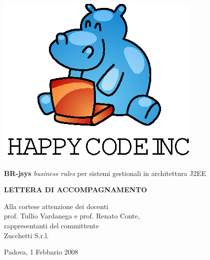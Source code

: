 \documentclass[11pt,titlepage,a4paper]{report}
\begin{document}
\begin{titlepage}
\begin{center}
\vspace*{0.5in}
\includegraphics{logo.eps}
\vspace*{0.2in}

{\Large \textbf{BR-jsys}}
{\Large \emph{business rules} per sistemi gestionali in architettura J2EE } 
\vspace{2in}

\LARGE \textbf {LETTERA DI ACCOMPAGNAMENTO}

\end{center}
\end{titlepage}
\vspace*{0.5in}


\thispagestyle{plain}
\begin{flushright}
Alla cortese attenzione dei docenti\\
prof. Tullio Vardanega e prof. Renato Conte,\\
rappresentanti del committente\\
Zucchetti S.r.l.
\end{flushright}
Padova, 1 Febbario 2008 \\
\end{document}
